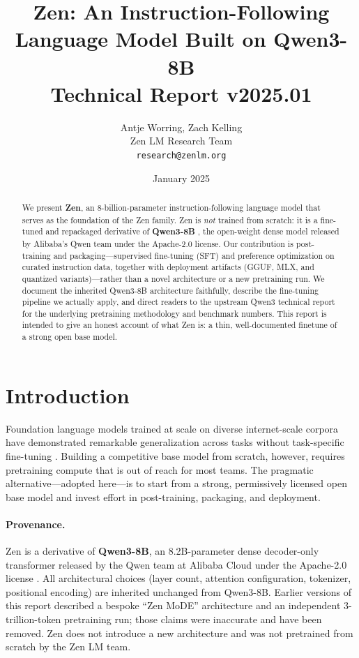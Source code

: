 \documentclass[11pt,a4paper]{article}
\title{\textbf{Zen: An Instruction-Following Language Model Built on Qwen3-8B}\\
\large Technical Report v2025.01}
\author{Antje Worring, Zach Kelling \\ Zen LM Research Team\\
\texttt{research@zenlm.org}}
\date{January 2025}
\begin{document}
\maketitle

\begin{abstract}
We present \textbf{Zen}, an 8-billion-parameter instruction-following language model that serves as
the foundation of the Zen family. Zen is \emph{not} trained from scratch: it is a fine-tuned and
repackaged derivative of \textbf{Qwen3-8B} \cite{qwen3report}, the open-weight dense model released
by Alibaba's Qwen team under the Apache-2.0 license. Our contribution is post-training and
packaging---supervised fine-tuning (SFT) and preference optimization on curated instruction data,
together with deployment artifacts (GGUF, MLX, and quantized variants)---rather than a novel
architecture or a new pretraining run. We document the inherited Qwen3-8B architecture faithfully,
describe the fine-tuning pipeline we actually apply, and direct readers to the upstream Qwen3
technical report for the underlying pretraining methodology and benchmark numbers. This report is
intended to give an honest account of what Zen is: a thin, well-documented finetune of a strong
open base model.
\end{abstract}

\tableofcontents
\newpage

\section{Introduction}

Foundation language models trained at scale on diverse internet-scale corpora have demonstrated
remarkable generalization across tasks without task-specific fine-tuning \cite{brown2020gpt3,
wei2022emergent}. Building a competitive base model from scratch, however, requires pretraining
compute that is out of reach for most teams. The pragmatic alternative---adopted here---is to start
from a strong, permissively licensed open base model and invest effort in post-training, packaging,
and deployment.

\paragraph{Provenance.} Zen is a derivative of \textbf{Qwen3-8B}, an 8.2B-parameter dense
decoder-only transformer released by the Qwen team at Alibaba Cloud under the Apache-2.0 license
\cite{qwen3report, qwen3hf}. All architectural choices (layer count, attention configuration,
tokenizer, positional encoding) are inherited unchanged from Qwen3-8B. Earlier versions of this
report described a bespoke ``Zen MoDE'' architecture and an independent 3-trillion-token pretraining
run; those claims were inaccurate and have been removed. Zen does not introduce a new architecture
and was not pretrained from scratch by the Zen LM team.
\end{document}
